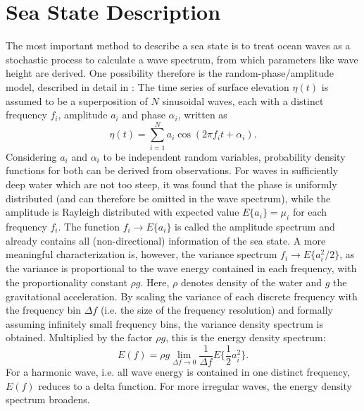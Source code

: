 \section{Sea State Description}
The most important method 
to describe a sea state is to treat ocean waves as a stochastic process to 
calculate a wave spectrum, from which parameters like wave height are derived. 
One possibility therefore is the random-phase/amplitude model, described in 
detail in \cite{holthuijsen2007}: The time series of surface elevation $ \eta 
(t)$ is assumed to be a superposition of $N$ sinusoidal waves, each with a 
distinct frequency $f_i$, amplitude $a_i$ and phase $\alpha_i$, written as
\begin{equation}
 \label{sinussum}
 \eta(t) = \sum_{i=1}^N a_i \cos (2\pi f_i t + \alpha_i).
\end{equation}
Considering $a_i$ and $\alpha_i$ to be independent random variables, 
probability density functions for both can be derived from observations. For 
waves in sufficiently deep water which are not too steep, it was found that the 
phase is uniformly distributed (and can therefore be omitted in the wave 
spectrum), while the amplitude is Rayleigh distributed with expected value 
$E\{a_i\} = \mu_i$ for each frequency $f_i$. The function $f_i \rightarrow 
E\{a_i\}$ is called the amplitude spectrum and already contains all 
(non-directional) information of the sea state. A more meaningful 
characterization is, however, the variance spectrum $f_i \rightarrow E\{a_i^2 
\slash 2\}$, as the variance is proportional to the wave energy contained in 
each frequency, with the proportionality constant $\rho g$. Here, $\rho$ 
denotes 
density of the water and $g$ the gravitational acceleration. By scaling the 
variance of each discrete frequency with the frequency bin $\Delta f$ (i.e. the 
size of the frequency resolution) and formally assuming infinitely small 
frequency bins, the variance density spectrum is obtained. Multiplied by the 
factor $\rho g$, this is the energy density spectrum:
\begin{equation}
 \label{vardensspec}
 E(f) = \rho g \lim_{\Delta f \rightarrow 0} \frac{1}{\Delta f} E\{\frac{1}{2} 
a_i^2\}.
\end{equation}
For a harmonic wave, i.e. all wave energy is contained in one distinct 
frequency, $E(f)$ reduces to a delta function. For more irregular waves, the 
energy density spectrum broadens. 

